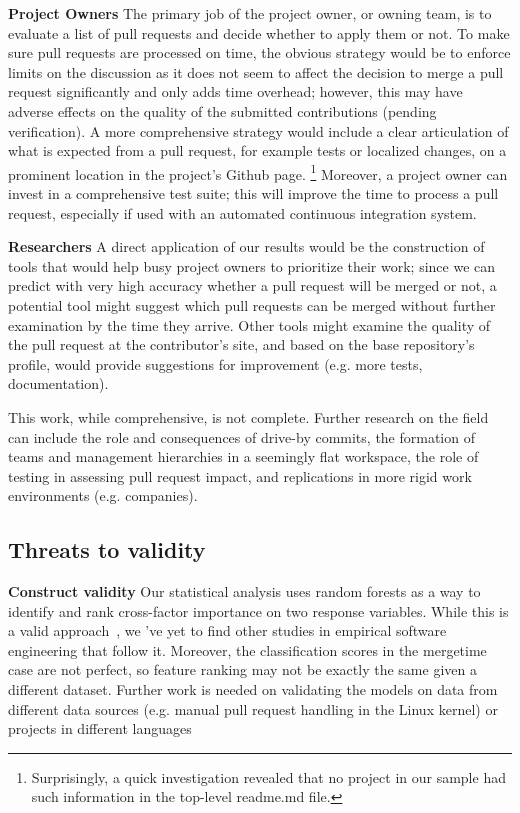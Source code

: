 \documentclass{acm_proc_article-sp}
\begin{document}
\textbf{Project Owners} The primary job of the project owner, or owning team,
is to evaluate a list of pull requests and decide whether to apply them or not.
To make sure pull requests are processed on time, the obvious strategy would be
to enforce limits on the discussion as it does not seem to affect the decision
to merge a pull request significantly and only adds time overhead; however, this
may have adverse effects on the quality of the submitted contributions
(pending verification). A more
comprehensive strategy would include a clear articulation of what is expected
from a pull request, for example tests or localized changes, on a prominent
location in the project's Github page. \footnote{Surprisingly, a quick
investigation revealed that no project in our sample had such information in
the top-level {\sc readme}.md file.} Moreover, a project owner can invest in a
comprehensive test suite; this will improve the time to process a pull request,
especially if used with an automated continuous integration system.


\textbf{Researchers}
A direct application of our results would be the construction of tools that
would help busy project owners to prioritize their work; since we can predict
with very high accuracy whether a pull request will be merged or not, a
potential tool might suggest which pull requests can be merged without further
examination by the time they arrive. Other tools might examine the quality of
the pull request at the contributor's site, and based on the base repository's
profile, would provide suggestions for improvement (e.g. more tests,
documentation). 

This work, while comprehensive, is not complete. Further research
on the field can include the role and consequences of drive-by commits, 
the formation of teams and management hierarchies in a seemingly flat
workspace, the role of testing in assessing pull request impact,
and replications in more rigid work environments (e.g. companies).

\subsection{Threats to validity}

\textbf{Construct validity} Our statistical analysis uses random forests as a way
to identify and rank cross-factor importance on two response variables. While
this is a valid approach~\cite{Genue10}, we 've yet to find other studies in
empirical software engineering that follow it. Moreover, the classification
scores in the \textsf{mergetime} case are not perfect, so feature ranking may
not be exactly the same given a different dataset. Further work is needed on
validating the models on data from different data sources (e.g. manual pull
request handling in the Linux kernel) or projects in different languages 
\end{document}
